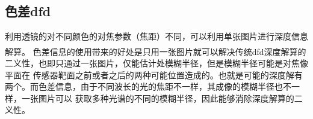 \documentclass[UTF8]{ctexart}
\newcommand{\myciteup}[1]{\textsuperscript{\textsuperscript{\cite{#1}}}}
\begin{document}
\begin{sloppypar}
        \subsection{色差dfd}
        利用透镜的对不同颜色的对焦参数（焦距）不同，可以利用单张图片进行深度信息解算\myciteup{buat2020active}\myciteup{ishihara2021depth}。
        色差信息的使用带来的好处是只用一张图片就可以解决传统dfd深度解算的二义性，也即只通过一张图片，仅能估计处模糊半径，但是模糊半径可能是对焦像平面在
        传感器靶面之前或者之后的两种可能位置造成的。也就是可能的深度解有两个。而色差信息，由于不同波长的光的焦距不一样，其成像的模糊半径也不一样，一张图片可以
        获取多种光谱的不同的模糊半径，因此能够消除深度解算的二义性。
        \begin{figure}[htbp]
            \quad
            \quad
\end{figure}
\end{sloppypar}
\end{document}

